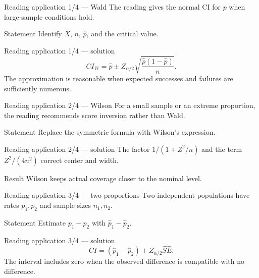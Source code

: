 \documentclass[10pt,aspectratio=169]{beamer}
\begin{document}
\begin{frame}{Reading application 1/4 --- Wald}
  \footnotesize
  The reading gives the normal CI for $p$ when large-sample conditions hold.
  \begin{block}{Statement}
    Identify $X$, $n$, $\hat p$, and the critical value.
  \end{block}
\end{frame}

\begin{frame}{Reading application 1/4 --- solution}
  \footnotesize
  \[
    CI_W=\hat p\pm Z_{\alpha/2}
    \sqrt{\frac{\hat p(1-\hat p)}{n}}.
  \]
  The approximation is reasonable when expected successes and failures are
  sufficiently numerous.
\end{frame}

\begin{frame}{Reading application 2/4 --- Wilson}
  \footnotesize
  For a small sample or an extreme proportion, the reading recommends score
  inversion rather than Wald.
  \begin{block}{Statement}
    Replace the symmetric formula with Wilson's expression.
  \end{block}
\end{frame}

\begin{frame}{Reading application 2/4 --- solution}
  \footnotesize
  The factor $1/(1+Z^2/n)$ and the term $Z^2/(4n^2)$ correct center and width.
  \begin{alertblock}{Result}
    Wilson keeps actual coverage closer to the nominal level.
  \end{alertblock}
\end{frame}

\begin{frame}{Reading application 3/4 --- two proportions}
  \footnotesize
  Two independent populations have rates $p_1,p_2$ and sample sizes $n_1,n_2$.
  \begin{block}{Statement}
    Estimate $p_1-p_2$ with $\hat p_1-\hat p_2$.
  \end{block}
\end{frame}

\begin{frame}{Reading application 3/4 --- solution}
  \footnotesize
  \[
    CI=(\hat p_1-\hat p_2)\pm Z_{\alpha/2}\widehat{SE}.
  \]
  The interval includes zero when the observed difference is compatible with no
  difference.
\end{frame}
\end{document}
